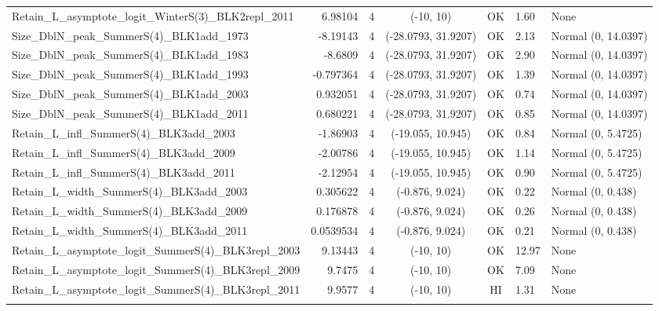 \documentclass[12pt,]{article}
\begin{document}
\begin{landscape}
\begin{longtable}{lrcccll}
  Retain\_L\_asymptote\_logit\_WinterS(3)\_BLK2repl\_2011 & 6.98104 & 4 & (-10, 10) & OK & 1.60 & None \\ 
  Size\_DblN\_peak\_SummerS(4)\_BLK1add\_1973 & -8.19143 & 4 & (-28.0793, 31.9207) & OK & 2.13 & Normal (0, 14.0397) \\ 
  Size\_DblN\_peak\_SummerS(4)\_BLK1add\_1983 & -8.6809 & 4 & (-28.0793, 31.9207) & OK & 2.90 & Normal (0, 14.0397) \\ 
  Size\_DblN\_peak\_SummerS(4)\_BLK1add\_1993 & -0.797364 & 4 & (-28.0793, 31.9207) & OK & 1.39 & Normal (0, 14.0397) \\ 
  Size\_DblN\_peak\_SummerS(4)\_BLK1add\_2003 & 0.932051 & 4 & (-28.0793, 31.9207) & OK & 0.74 & Normal (0, 14.0397) \\ 
  Size\_DblN\_peak\_SummerS(4)\_BLK1add\_2011 & 0.680221 & 4 & (-28.0793, 31.9207) & OK & 0.85 & Normal (0, 14.0397) \\ 
  Retain\_L\_infl\_SummerS(4)\_BLK3add\_2003 & -1.86903 & 4 & (-19.055, 10.945) & OK & 0.84 & Normal (0, 5.4725) \\ 
  Retain\_L\_infl\_SummerS(4)\_BLK3add\_2009 & -2.00786 & 4 & (-19.055, 10.945) & OK & 1.14 & Normal (0, 5.4725) \\ 
  Retain\_L\_infl\_SummerS(4)\_BLK3add\_2011 & -2.12954 & 4 & (-19.055, 10.945) & OK & 0.90 & Normal (0, 5.4725) \\ 
  Retain\_L\_width\_SummerS(4)\_BLK3add\_2003 & 0.305622 & 4 & (-0.876, 9.024) & OK & 0.22 & Normal (0, 0.438) \\ 
  Retain\_L\_width\_SummerS(4)\_BLK3add\_2009 & 0.176878 & 4 & (-0.876, 9.024) & OK & 0.26 & Normal (0, 0.438) \\ 
  Retain\_L\_width\_SummerS(4)\_BLK3add\_2011 & 0.0539534 & 4 & (-0.876, 9.024) & OK & 0.21 & Normal (0, 0.438) \\ 
  Retain\_L\_asymptote\_logit\_SummerS(4)\_BLK3repl\_2003 & 9.13443 & 4 & (-10, 10) & OK & 12.97 & None \\ 
  Retain\_L\_asymptote\_logit\_SummerS(4)\_BLK3repl\_2009 & 9.7475 & 4 & (-10, 10) & OK & 7.09 & None \\ 
  Retain\_L\_asymptote\_logit\_SummerS(4)\_BLK3repl\_2011 & 9.9577 & 4 & (-10, 10) & HI & 1.31 & None \\ 
   \hline
\hline
\label{tab:model_params}
\end{longtable}
\endgroup
\end{landscape}

\newpage

\FloatBarrier
\end{document}
